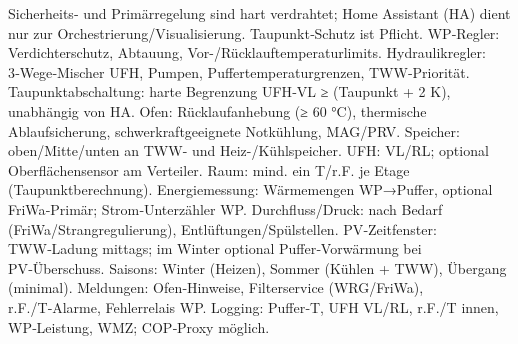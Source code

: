 \markdownRendererDocumentBegin
\markdownRendererSectionBegin
{}\markdownRendererInterblockSeparator
{}Sicherheits‑ und Primärregelung sind hart verdrahtet; Home Assistant (HA) dient nur zur Orchestrierung/Visualisierung. Taupunkt‑Schutz ist Pflicht.\markdownRendererInterblockSeparator
{}\markdownRendererSectionBegin
{}\markdownRendererInterblockSeparator
{}\markdownRendererUlBeginTight
\markdownRendererUlItem WP‑Regler: Verdichterschutz, Abtauung, Vor-/Rücklauftemperaturlimits.\markdownRendererUlItemEnd 
\markdownRendererUlItem Hydraulikregler: 3‑Wege‑Mischer UFH, Pumpen, Puffertemperaturgrenzen, TWW‑Priorität.\markdownRendererUlItemEnd 
\markdownRendererUlItem Taupunktabschaltung: harte Begrenzung UFH‑VL ≥ (Taupunkt + 2 K), unabhängig von HA.\markdownRendererUlItemEnd 
\markdownRendererUlItem Ofen: Rücklaufanhebung (≥ 60 °C), thermische Ablaufsicherung, schwerkraftgeeignete Notkühlung, MAG/PRV.\markdownRendererUlItemEnd 
\markdownRendererUlEndTight \markdownRendererInterblockSeparator
{}
\markdownRendererSectionEnd \markdownRendererSectionBegin
{}\markdownRendererInterblockSeparator
{}\markdownRendererUlBeginTight
\markdownRendererUlItem Speicher: oben/Mitte/unten an TWW- und Heiz-/Kühlspeicher.\markdownRendererUlItemEnd 
\markdownRendererUlItem UFH: VL/RL; optional Oberflächensensor am Verteiler.\markdownRendererUlItemEnd 
\markdownRendererUlItem Raum: mind. ein T/r.F. je Etage (Taupunktberechnung).\markdownRendererUlItemEnd 
\markdownRendererUlItem Energiemessung: Wärmemengen WP→Puffer, optional FriWa‑Primär; Strom‑Unterzähler WP.\markdownRendererUlItemEnd 
\markdownRendererUlItem Durchfluss/Druck: nach Bedarf (FriWa/Strangregulierung), Entlüftungen/Spülstellen.\markdownRendererUlItemEnd 
\markdownRendererUlEndTight \markdownRendererInterblockSeparator
{}
\markdownRendererSectionEnd \markdownRendererSectionBegin
{}\markdownRendererInterblockSeparator
{}\markdownRendererUlBeginTight
\markdownRendererUlItem PV‑Zeitfenster: TWW‑Ladung mittags; im Winter optional Puffer‑Vorwärmung bei PV‑Überschuss.\markdownRendererUlItemEnd 
\markdownRendererUlItem Saisons: Winter (Heizen), Sommer (Kühlen + TWW), Übergang (minimal).\markdownRendererUlItemEnd 
\markdownRendererUlItem Meldungen: Ofen‑Hinweise, Filterservice (WRG/FriWa), r.F./T‑Alarme, Fehlerrelais WP.\markdownRendererUlItemEnd 
\markdownRendererUlItem Logging: Puffer‑T, UFH VL/RL, r.F./T innen, WP‑Leistung, WMZ; COP‑Proxy möglich.\markdownRendererUlItemEnd 
